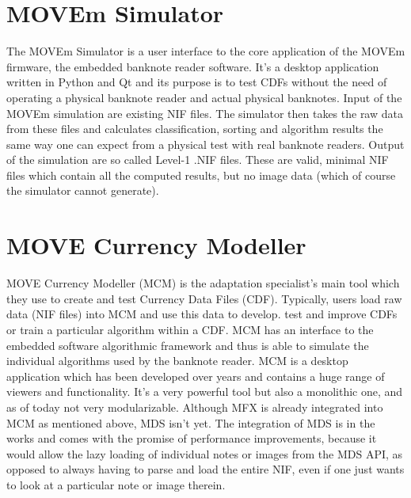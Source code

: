 \section{MOVEm Simulator}
The MOVEm Simulator is a user interface to the core application of the MOVEm firmware, the embedded banknote reader software. It's a desktop application written in Python and Qt and its purpose is to test CDFs without the need of operating a physical banknote reader and actual physical banknotes. Input of the MOVEm simulation are existing NIF files. The simulator then takes the raw data from these files and calculates classification, sorting and algorithm results the same way one can expect from a physical test with real banknote readers. Output of the simulation are so called Level-1 .NIF files. These are valid, minimal NIF files which contain all the computed results, but no image data (which of course the simulator cannot generate). 

\section{MOVE Currency Modeller}
MOVE Currency Modeller (MCM) is the adaptation specialist's main tool which they use to create and test Currency Data Files (CDF). Typically, users load raw data (NIF files) into MCM and use this data to develop. test and improve CDFs or train a particular algorithm within a CDF. MCM has an interface to the embedded software algorithmic framework and thus is able to simulate the individual algorithms used by the banknote reader. MCM is a desktop application which has been developed over years and contains a huge range of viewers and functionality. It's a very powerful tool but also a monolithic one, and as of today not very modularizable. Although MFX is already integrated into MCM as mentioned above, MDS isn't yet. The integration of MDS is in the works and comes with the promise of performance improvements, because it would allow the lazy loading of individual notes or images from the MDS API, as opposed to always having to parse and load the entire NIF, even if one just wants to look at a particular note or image therein.

